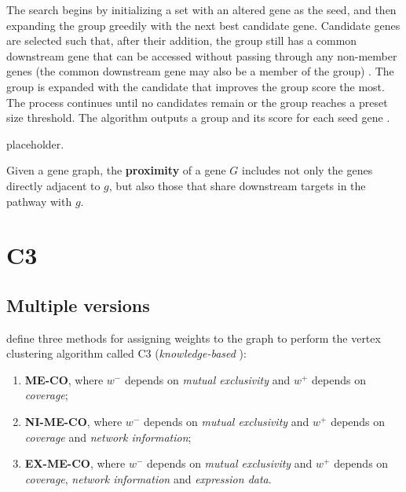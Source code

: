 The search begins by initializing a set with an altered gene as the seed, and then expanding the group greedily with the next best candidate gene. Candidate genes are selected such that, after their addition, the group still has a common downstream gene that can be accessed without passing through any non-member genes (the common downstream gene may also be a member of the group) . The group is expanded with the candidate that improves the group score the most. The process continues until no candidates remain or the group reaches a preset size threshold. The algorithm outputs a group and its score for each seed gene .

placeholder. 

\begin{definition}[Proximity]
    Given a gene graph, the \textbf{proximity} of a gene $G$ includes not only the genes directly adjacent to $g$, but also those that share downstream targets in the pathway with $g$. 
\end{definition}

\section{C3}

\subsection{Multiple versions}

\textcite{c3} define three methods for assigning weights to the graph to perform the vertex clustering algorithm called C3 (\textit{knowledge-based} \cite{survey}):

\begin{enumerate}
    \item \textbf{ME-CO}, where $w^-$ depends on \textit{mutual exclusivity} and $w^+$ depends on \textit{coverage};
    \item \textbf{NI-ME-CO}, where $w^-$ depends on \textit{mutual exclusivity} and $w^+$ depends on \textit{coverage} and \textit{network information};
    \item \textbf{EX-ME-CO}, where $w^-$ depends on \textit{mutual exclusivity} and $w^+$ depends on \textit{coverage}, \textit{network information} and \textit{expression data}.
\end{enumerate}

